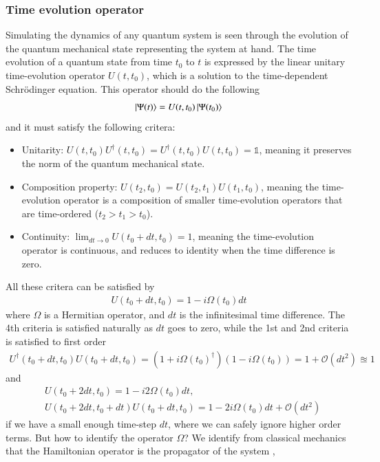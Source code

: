 \documentclass{subfiles}
\begin{document}
\subsubsection{Time evolution operator}
Simulating the dynamics of any quantum system is seen through the evolution of the quantum mechanical state representing the system at hand. The time evolution of a quantum state from time $t_0$ to $t$ is expressed by the linear unitary time-evolution operator $U(t, t_0)$, which is a solution to the time-dependent Schrödinger equation.\cite{sakurai1986modern} This operator should do the following
\begin{equation}
    \ket{\Psi(t)} = U(t, t_0)\ket{\Psi(t_0)}
\end{equation}
and it must satisfy the following critera:
\begin{itemize}
    \item Unitarity: $U(t, t_0)U^\dagger(t, t_0) = U^\dagger(t, t_0)U(t, t_0) = \mathbb{1}$, meaning it preserves the norm of the quantum mechanical state.
    \item Composition property: $U(t_2, t_0) = U(t_2, t_1)U(t_1, t_0)$, meaning the time-evolution operator is a composition of smaller time-evolution operators that are time-ordered ($t_2>t_1>t_0$).
    \item Continuity: $\lim_{dt\to 0}U(t_0 + dt, t_0) = \mathcal{1}$, meaning the time-evolution operator is continuous, and reduces to identity when the time difference is zero.
\end{itemize}
All these critera can be satisfied by 
\begin{align*}
    U(t_0 + dt, t_0) = 1 - i\Omega(t_0) dt
\end{align*}
where $\Omega$ is a Hermitian operator, and $dt$ is the infinitesimal time difference. The 4th criteria is satisfied naturally as $dt$ goes to zero, while the 1st and 2nd criteria is satisfied to first order 
\begin{align*}
    U^\dagger(t_0 + dt, t_0)U(t_0 + dt, t_0) = (1 + i\Omega(t_0)^\dagger)(1 - i\Omega(t_0)) = 1 + \mathcal{O}(dt^2) \approxeq 1
\end{align*}
and
\begin{align*}
    &U(t_0 + 2dt, t_0) = 1 - i2\Omega(t_0)dt, \\
    &U(t_0 + 2dt, t_0 +dt)U(t_0 + dt, t_0) = 1 - 2i\Omega(t_0)dt + \mathcal{O}(dt^2)
\end{align*}
if we have a small enough time-step $dt$, where we can safely ignore higher order terms. But how to identify the operator $\Omega$? We identify from classical mechanics that the Hamiltonian operator is the propagator of the system \cite{sakurai1986modern}, 
\end{document}
